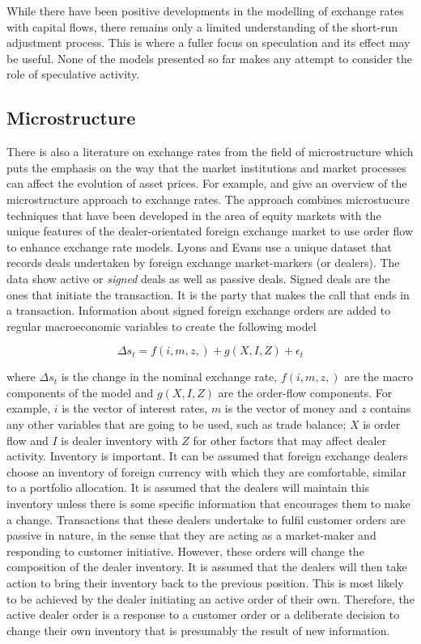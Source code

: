 \documentclass[12pt, a4paper, oneside]{article}\usepackage[]{graphicx}\usepackage[]{color}
\begin{document}
While there have been positive developments in the modelling of exchange rates with capital flows, there remains only a limited understanding of the short-run adjustment process. This is where a fuller focus on speculation and its effect may be useful.  None of the models presented so far makes any attempt to consider the role of speculative activity.  


\subsection{Microstructure}
There is also a  literature on exchange rates from the field of microstructure which puts the emphasis on the way that the market institutions and market processes can affect the evolution of asset prices.   For example, \citep{Evans2002Order} and  \citep{Lyons1995Microstructure} give an overview of the microstructure approach to exchange rates.  The approach combines microstucure techniques that have been developed in the area of equity markets \citep{maureen1998market} with the unique features of the dealer-orientated foreign exchange market to use order flow to enhance exchange rate models.   Lyons and Evans use a unique dataset that records deals undertaken by foreign exchange market-markers (or dealers).  The data show active or \emph{signed} deals as well as passive deals. Signed deals are the ones that initiate the transaction.  It is the party that makes the call that ends in a transaction. Information about signed foreign exchange orders are added to regular macroeconomic variables to create the following model

\begin{equation}
 \Delta s_t=f(i,m,z,)+g(X,I,Z)+\epsilon_t
\end{equation}

where $\Delta s_t$ is the change in the nominal exchange rate, $f(i,m,z,)$ are the macro components of the model and $g(X,I,Z)$ are the order-flow components. For example, $i$ is the vector of interest rates, $m$ is the vector of money and $z$ contains any other variables that are going to be used, such as trade balance; $X$ is order flow and $I$ is dealer inventory with $Z$ for other factors that may affect dealer activity.   Inventory is important. It can be assumed that foreign exchange dealers choose an inventory of foreign currency with which they are comfortable, similar to a portfolio allocation.   It is assumed that the dealers will maintain this inventory unless there is some specific information that encourages them to make a change.  Transactions that these dealers undertake to fulfil customer orders are passive in nature, in the sense that they are acting as a market-maker and responding to customer initiative.  However, these orders will change the composition of the dealer inventory.  It is assumed that the dealers will then take action to bring their inventory back to the previous position.  This is most likely to be achieved by the dealer initiating an active order of their own.  Therefore, the active dealer order is a response to a customer order or a deliberate decision to change their own inventory that is presumably the result of new information. 
\end{document}
